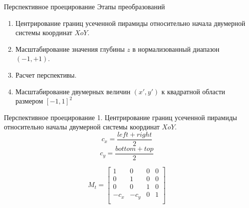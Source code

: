 \documentclass{beamer}
\begin{document}
	\begin{frame}{Перспективное проецирование}
		Этапы преобразований
		\begin{enumerate}
			\item Центрирование границ усеченной пирамиды относительно начала двумерной системы координат $XoY$.
			\item Масштабирование значения глубины $z$ в нормализованный диапазон $(-1, +1)$.
			\item Расчет перспективы.
			\item Масштабирование двумерных величин $(x', y')$ к квадратной области размером $[-1, 1]^2$
			\end{enumerate}


		\end{frame}

	\begin{frame}{Перспективное проецирование}
		1. Центрирование границ усеченной пирамиды относительно началы двумерной системы координат $XoY$.
		\[
			c_x = \frac{left + right}{2}
		\]
		\[
			c_y = \frac{bottom + top}{2}
		\]

		\[
			M_t = 
			\begin{bmatrix}
				1 & 0 & 0 & 0 \\
				0 & 1 & 0 & 0 \\
				0 & 0 & 1 & 0 \\
				-c_x & -c_y & 0 & 1 \\
			\end{bmatrix}	
		\]
	\end{frame}
\end{document}
